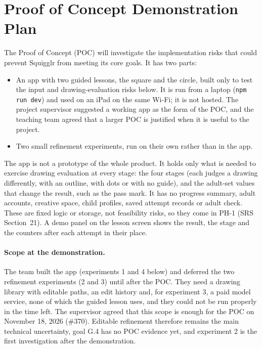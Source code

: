 \documentclass{article}
\begin{document}
\section{Proof of Concept Demonstration Plan}
\label{sec:poc-plan}

The Proof of Concept (POC) will investigate the implementation risks
that could prevent Squigglr from meeting its core goals. It has two parts:

\begin{itemize}
    \item An app with two guided lessons, the square and the circle, built
    only to test the input and drawing-evaluation risks below. It is run from
    a laptop (\texttt{npm run dev}) and used on an iPad on the same Wi-Fi; it
    is not hosted. The project supervisor suggested a working app as the form
    of the POC, and the teaching team agreed that a larger POC is justified
    when it is useful to the project.
    \item Two small refinement experiments, run on their own rather than in
    the app.
\end{itemize}

The app is not a prototype of the whole product. It holds only what is
needed to exercise drawing evaluation at every stage: the four stages (each
judges a drawing differently, with an outline, with dots or with no guide), and
the adult-set values that change the result, such as the pass mark. It has no
progress summary, adult accounts, creative space, child profiles, saved
attempt records or adult check. These are fixed logic or storage, not
feasibility risks, so they come in PH-1 (SRS Section~21). A demo panel on the
lesson screen shows the result, the stage and the counters after each attempt
in their place.

\paragraph{Scope at the demonstration.} The team built the app
(experiments 1 and 4 below) and deferred the two refinement experiments
(2 and 3) until after the POC. They need a drawing library with editable paths,
an edit history and, for experiment 3, a paid model service, none of which the
guided lesson uses, and they could not be run properly in the time left. The
supervisor agreed that this scope is enough for the POC on November 18, 2026
(\#370). Editable refinement therefore remains the main technical uncertainty,
goal G.4 has no POC evidence yet, and experiment 2 is the first investigation
after the demonstration.
\end{document}

